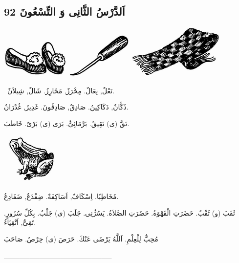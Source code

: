 \documentclass[a5paper]{article}
\begin{document}
\subsection{اَلدَّرْسُ الثَّانِى وَ التِّسْعُونَ 92}
 \includegraphics[width=1.3335in,height=0.7602in]{MuhammadBagauddinlatinized-img255.png}   \includegraphics[width=1.2917in,height=0.9165in]{MuhammadBagauddinlatinized-img256.png}   \includegraphics[width=1.8854in,height=1.052in]{MuhammadBagauddinlatinized-img257.png} 

\ نَعْلٌ, نِعَالٌ. مِخْرَزٌ, مَخَارِزُ. شَالٌ, شِيلاَنٌ. 

دُكَّانٌ, دَكَاكِينُ. صَادِقٌ, صَادِقُونَ. غَدِيرٌ, غُدْرَانٌ. 

نَقَّ (ى) نَقِيقٌ. بَرَّمَائِىٌّ. بَرَى (ى) بَرْىٌ. خَاطَبَ. 

\  \includegraphics[width=1.052in,height=1.0102in]{MuhammadBagauddinlatinized-img258.png} 

مُخَاطِبًا. اِسْكَافٌ, اَسَاكِفَةٌ. ضِفْدَعٌ, ضَفَادِعُ. 

ثَقَبَ (و) ثَقْبٌ. حَضَرَتِ الْقَهْوَةُ. حَضَرَتِ الصَّلاَةُ. يَسُرُّنِى. جَلَبَ (ى) جَلْبٌ. بِكُلِّ سُرُورٍ. تَقِىٌّ, اَتْقِيَاءُ.

مُحِبٌّ لِلْعِلْمِ. اَللَّهُ يَرْضَى عَنْكَ. حَرَصَ (ى) حِرْصٌ. صَاحَبَ

\_\_\_\_\_\_\_\_\_\_\_\_\_\_\_\_\_\_\_\_\_
\end{document}
